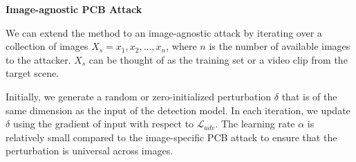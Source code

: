 \textbf{Image-agnostic PCB Attack}


We can extend the method to an image-agnostic attack by iterating over a collection of images $X_{s} = {x_{1}, x_{2}, ..., x_{n}}$, where $n$ is the number of available images to the attacker. $X_{s}$ can be thought of as the training set or a video clip from the target scene. 

Initially, we generate a random or zero-initialized perturbation $\delta$ that is of the same dimension as the input of the detection model. In each iteration, we update $\delta$ using the gradient of input with respect to $\mathcal{L}_{adv}$. The learning rate $\alpha$ is relatively small compared to the image-specific PCB attack to ensure that the perturbation is universal across images. 



